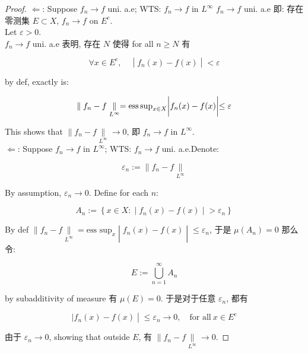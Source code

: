 \begin{proof}

\(\Leftarrow\): Suppose \(f_{n}\rightarrow f\) uni. a.e; WTS: \(f_{n}\rightarrow f\) in \(L^{\infty}\) \(f_{n}\rightarrow f\) uni. a.e 即: 存在零测集 \(E \subset X\), \(f_{n}\rightarrow f\) on \(E^{c}\).\\
Let \(\varepsilon > 0\).\\
\(f_{n}\rightarrow f\) uni. a.e 表明, 存在 \(N\) 使得 for all \(n \geq N\) 有

\[\left. \forall x \in E^{c},\quad \middle| f_{n}(x) - f(x) \middle| < \varepsilon \right.\]

by def, exactly is:

\[\left. \parallel f_{n} - f\underset{L^{\infty}}{\parallel} = \text{ess\,sup}_{x \in X} \middle| f_{n}(x) - f(x) \middle| \leq \varepsilon \right.\]

This shows that \(\parallel f_{n} - f\underset{L^{\infty}}{\parallel}\rightarrow 0\), 即 \(f_{n}\rightarrow f\) in \(L^{\infty}\).\\
\(\Leftarrow\): Suppose \(f_{n}\rightarrow f\) in \(L^{\infty}\); WTS: \(f_{n}\rightarrow f\) uni. a.e.Denote:

\[\varepsilon_{n} := \parallel f_{n} - f\underset{L^{\infty}}{\parallel}\]

By assumption, \(\varepsilon_{n}\rightarrow 0\). Define for each \(n\):

\[A_{n} := \left\{ x \in X: \middle| f_{n}(x) - f(x) \middle| > \varepsilon_{n} \right\}\]

By def \(\left. \parallel f_{n} - f\underset{L^{\infty}}{\parallel} = \text{ess sup}_{x} \middle| f_{n}(x) - f(x) \middle| \leq \varepsilon_{n} \right.\), 于是 \(\mu(A_{n}) = 0\) 那么令:

\[E := \bigcup\limits_{n = 1}^{\infty}A_{n}\]

by subadditivity of measure 有 \(\mu(E) = 0\). 于是对于任意 \(\varepsilon_{n}\), 都有

\[\left. |f_{n}(x) - f(x) \middle| \leq \varepsilon_{n}\rightarrow 0,\quad\text{for all}\ x \in E^{c} \right.\]

由于 \(\varepsilon_{n}\rightarrow 0\), showing that outside \(E\), 有 \(\parallel f_{n} - f\underset{L^{\infty}}{\parallel}\rightarrow 0\).

\end{proof}

